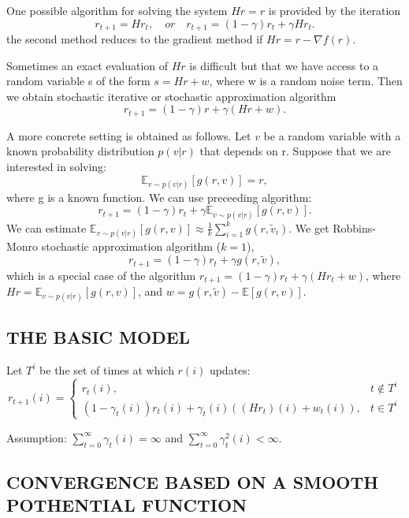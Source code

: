 One possible algorithm for solving the system $ Hr = r $ is provided by the iteration
\[
    r_{t+1} = H r_{t}, \quad or \quad r_{t+1} = (1 - \gamma)r_{t} + \gamma H r_{t}.
\]
the second method reduces to the gradient method if $ Hr = r - \nabla f(r) $.

Sometimes an exact evaluation of $ Hr $ is difficult but that we have access to a random variable s of the form $ s = Hr + w $, where w is a random noise term.
Then we obtain stochastic iterative or stochastic approximation algorithm
\[
    r_{t+1} = (1 - \gamma)r + \gamma(Hr + w).
\]

A more concrete setting is obtained as follows. Let $ v $ be a random variable with a known probability distribution $ p(v|r) $ that depends on r. Suppose that we are interested in solving:
\[
    \mathbb{E}_{v \sim p(v|r) } \left[ g(r,v) \right] = r,
\]
where g is a known function.
We can use preceeding algorithm:
\[
    r_{t+1} = (1 - \gamma) r_{t} + \gamma \mathbb{E}_{v \sim p(v|r)} \left[ g(r,v) \right].
\]
We can estimate $ \mathbb{E}_{v \sim p(v|r)} \left[ g(r,v) \right] \approx \frac{1}{k}  \sum^{k}_{i=1} g(r, \tilde v_i)$.
We get Robbins-Monro stochastic approximation algorithm ($ k=1 $),
\[
    r_{t+1} = (1 - \gamma) r_{t} + \gamma g(r, \tilde v),
\]
which is a special case of the algorithm $ r_{t+1} = (1 - \gamma)r_{t} + \gamma \left( Hr_{t} + w \right) $,
where $ Hr = \mathbb{E}_{v\sim p(v|r)}\left[ g(r,v) \right] $, and $ w = g(r, \tilde v) - \mathbb{E}\left[ g(r,v) \right] $.

\subsection{THE BASIC MODEL}%

Let $ T^i $ be the set of times at which $ r(i) $ updates:
\[
    r_{t+1}(i) =
    \begin{cases}
        r_t(i), & t \notin T^i\\
        (1 - \gamma_t(i))r_t(i) + \gamma_t(i) \left( (Hr_t)(i) + w_t(i) \right),& t \in T^i
    \end{cases}
\]

Assumption: $ \sum^{\infty}_{t=0} \gamma_t(i) = \infty $ and $ \sum^{\infty}_{t=0} \gamma^2_t(i) < \infty $.

\subsection{CONVERGENCE BASED ON A SMOOTH POTHENTIAL FUNCTION}%

